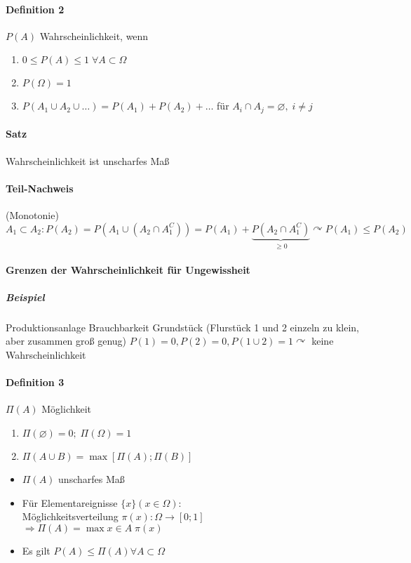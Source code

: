 \documentclass[a4paper]{scrartcl}
\begin{document}
\paragraph{Definition 2} $P(A)$ Wahrscheinlichkeit, wenn
\begin{enumerate}
\item $0 \leq P(A) \leq 1 \; \forall A \subset \Omega$
\item $P(\Omega) = 1$
\item $P(A_1 \cup A_2 \cup \dots ) = P(A_1) + P(A_2) + \dots$ für $A_i \cap A_j = \varnothing , \; i \neq j$
\end{enumerate}

\paragraph{Satz} Wahrscheinlichkeit ist unscharfes Maß

\paragraph{Teil-Nachweis} (Monotonie)\\
$A_1 \subset A_2 : P(A_2) = P(A_1 \cup (A_2 \cap A_1^C)) = P(A_1) + \underbrace{P(A_2 \cap A_1^C)}_{\geq 0} \curvearrowright P(A_1) \leq P(A_2)$

\paragraph{Grenzen der Wahrscheinlichkeit für Ungewissheit}

\subparagraph{Beispiel} Produktionsanlage
Brauchbarkeit Grundstück (Flurstück 1 und 2 einzeln zu klein, aber zusammen groß genug)
$P(1) = 0, P(2) = 0, P(1 \cup 2) = 1 \curvearrowright$ keine Wahrscheinlichkeit

\paragraph{Definition 3} $\Pi (A)$ Möglichkeit
\begin{enumerate}
\item $\Pi (\varnothing) = 0; \; \Pi (\Omega) = 1$
\item $\Pi (A \cup B) = \max [ \Pi (A); \Pi (B) ]$
\end{enumerate}
\begin{itemize}
\item $\Pi (A)$ unscharfes Maß
\item Für Elementareignisse $\{ x \} (x \in \Omega)$:\\
Möglichkeitsverteilung $\pi (x) : \Omega \rightarrow [0;1]$\\
$\Rightarrow \Pi (A) = \max x \in A \;  \pi (x)$
\item Es gilt $P(A) \leq \Pi (A) \forall A \subset \Omega$
\end{itemize}
\end{document}
